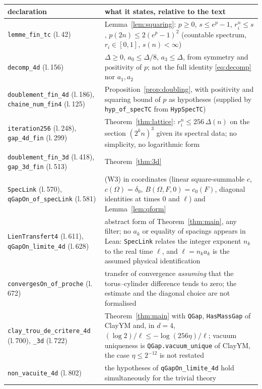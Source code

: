 \documentclass[11pt,a4paper]{article}
\theoremstyle{plain}
\theoremstyle{definition}
\theoremstyle{remark}
\numberwithin{equation}{section}
\begin{document}
\begin{center}\footnotesize
\begin{tabular}{@{}>{\raggedright\arraybackslash}p{}>{\raggedright\arraybackslash}p{}@{}}
\toprule
declaration & what it states, relative to the text\\
\midrule
\texttt{lemme\_fin\_tc} (l.\,42) & Lemma~\ref{lem:squaring}: $p\ge0$, $s\le e^p-1$, $r_i^n\le s$, $p(2n)\le2(e^p-1)^2$ (countable spectrum, $r_i\in[0,1]$, $s(n)<\infty$)\\
\texttt{decomp\_4d} (l.\,156) & $\Delta\ge0$, $a_0\le\Delta/8$, $a_3\le\Delta$, from symmetry and positivity of $p$; not the full identity \eqref{eq:decomp} nor $a_1,a_2$\\
\texttt{doublement\_fin\_4d} (l.\,186), \texttt{chaine\_num\_fin4} (l.\,125) & Proposition~\ref{prop:doubling}, with positivity and squaring bound of $p$ as hypotheses (supplied by \texttt{hyp\_of\_specTC} from \texttt{HypSpecTC})\\
\texttt{iteration256} (l.\,248), \texttt{gap\_4d\_fin} (l.\,299) & Theorem~\ref{thm:lattice}: $r_i^n\le256\,\Delta(n)$ on the section $(2^kn)^3$ given its spectral data; no simplicity, no logarithmic form\\
\texttt{doublement\_fin\_3d} (l.\,418), \texttt{gap\_3d\_fin} (l.\,513) & Theorem~\ref{thm:3d}\\
\texttt{SpecLink} (l.\,570), \texttt{qGapOn\_of\_specLink} (l.\,581) & (W3) in coordinates (linear square-summable $c$, $c(\Omega)=\delta_0$, $B(\Omega,F,0)=c_0(F)$, diagonal identities at times $0$ and $\ell$) and Lemma~\ref{lem:qform}\\
\texttt{LienTransfert4} (l.\,611), \texttt{qGapOn\_limite\_4d} (l.\,628) & abstract form of Theorem~\ref{thm:main}, any filter; no $a_k$ or equality of spacings appears in Lean: \texttt{SpecLink} relates the integer exponent $n_k$ to the real time $\ell$, and $\ell=n_ka_k$ is the assumed physical identification\\
\texttt{convergesOn\_of\_proche} (l.\,672) & transfer of convergence \emph{assuming} that the torus--cylinder difference tends to zero; the estimate and the diagonal choice are not formalised\\
\texttt{clay\_trou\_de\_critere\_4d} (l.\,700), \texttt{\_3d} (l.\,722) & Theorem~\ref{thm:main} with \texttt{QGap}, \texttt{HasMassGap} of ClayYM and, in $d=4$, $(\log2)/\ell\le-\log(256\eta)/\ell$; vacuum uniqueness is \texttt{QGap.vacuum\_unique} of ClayYM, the case $\eta\le2^{-12}$ is not restated\\
\texttt{non\_vacuite\_4d} (l.\,802) & the hypotheses of \texttt{qGapOn\_limite\_4d} hold simultaneously for the trivial theory\\
\bottomrule
\end{tabular}
\end{center}
\end{document}
